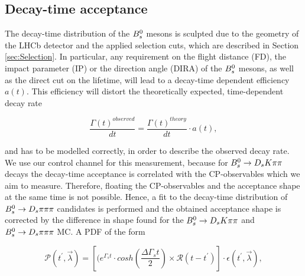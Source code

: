 \clearpage

\subsection{Decay-time acceptance}
\label{sec:timeAcceptance}
The decay-time distribution of the ${{B}^0_{s}}$ mesons is sculpted due to the geometry of the LHCb detector and the applied selection cuts, which are described in Section \ref{sec:Selection}.
In particular, any requirement on the flight distance (FD), the impact parameter (IP) or the direction angle (DIRA) of the ${{B}^0_{s}}$ mesons, as well as the direct cut on the lifetime, will lead to a decay-time dependent efficiency $a(t)$. This efficiency will distort the theoretically expected, time-dependent decay rate

\begin{equation}
\frac{\Gamma(t)^{observed}}{dt} = \frac{\Gamma(t)^{theory}}{dt} \cdot a(t),
\label{eq:DecRateAcc}
\end{equation} 

and has to be modelled correctly, in order to describe the observed decay rate. We use our control channel for this measurement, because for ${{B}^0_{s}}\rightarrow{\ensuremath{{D}_{s}}}{\ensuremath{K}}{\ensuremath{\pi}}{\ensuremath{\pi}}$ decays the decay-time acceptance is correlated with the CP-observables which we aim to measure. Therefore, floating the CP-observables and the acceptance shape at the same time is not possible. 
Hence, a fit to the decay-time distribution of ${{B}^0_{s}}\rightarrow{\ensuremath{{D}_{s}}}{\ensuremath{\pi}}{\ensuremath{\pi}}{\ensuremath{\pi}}$ candidates is performed and the obtained acceptance shape is corrected by the difference in shape found for the ${{B}^0_{s}}\rightarrow{\ensuremath{{D}_{s}}}{\ensuremath{K}}{\ensuremath{\pi}}{\ensuremath{\pi}}$ and ${{B}^0_{s}}\rightarrow{\ensuremath{{D}_{s}}}{\ensuremath{\pi}}{\ensuremath{\pi}}{\ensuremath{\pi}}$ MC. \newline
A PDF of the form

\begin{equation}
\mathcal{P}(t^{'},\vec{\lambda}) = \left[ (e^{\Gamma_{s}t}\cdot cosh(\frac{\Delta\Gamma_{s}t}{2}) \times \mathcal{R}(t - t^{'})\right] \cdot \epsilon(t^{'}, \vec{\lambda}),
\label{eq:AccPDF}
\end{equation}

